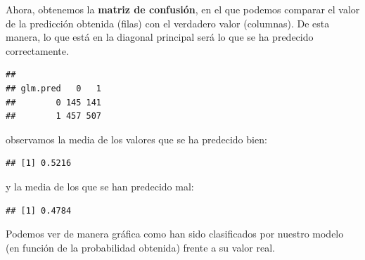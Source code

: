 \documentclass[]{book}
\newenvironment{Shaded}{\begin{snugshade}}{\end{snugshade}}
\newcommand{\KeywordTok}[1]{\textcolor[rgb]{0.13,0.29,0.53}{\textbf{#1}}}
\newcommand{\NormalTok}[1]{#1}
\newcommand{\OperatorTok}[1]{\textcolor[rgb]{0.81,0.36,0.00}{\textbf{#1}}}
\newcommand{\StringTok}[1]{\textcolor[rgb]{0.31,0.60,0.02}{#1}}
\begin{document}
Ahora, obtenemos la \textbf{matriz de confusión}, en el que podemos comparar el valor de la predicción obtenida (filas) con el verdadero valor (columnas). De esta manera, lo que está en la diagonal principal será lo que se ha predecido correctamente.

\begin{Shaded}
\end{Shaded}

\begin{verbatim}
##         
## glm.pred   0   1
##        0 145 141
##        1 457 507
\end{verbatim}

observamos la media de los valores que se ha predecido bien:

\begin{Shaded}
\end{Shaded}

\begin{verbatim}
## [1] 0.5216
\end{verbatim}

y la media de los que se han predecido mal:

\begin{Shaded}
\end{Shaded}

\begin{verbatim}
## [1] 0.4784
\end{verbatim}

Podemos ver de manera gráfica como han sido clasificados por nuestro modelo (en función de la probabilidad obtenida) frente a su valor real.
\end{document}
